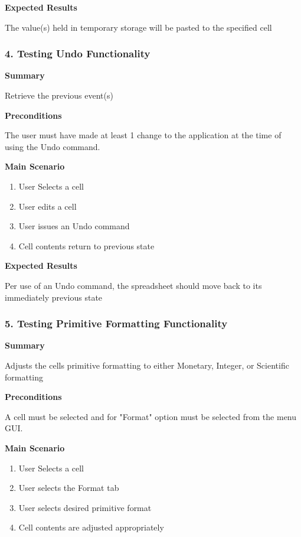 \documentclass[12pt]{article}
\begin{document}
\noindent
{\bf Expected Results}

The value(s) held in temporary storage will be pasted to the specified cell


\subsubsection{4. Testing Undo Functionality}

\noindent
{\bf Summary}

Retrieve the previous event(s)

\noindent
{\bf Preconditions}

The user must have made at least 1 change to the application at the time of using the Undo command. 

\noindent
{\bf Main Scenario}
\begin{enumerate}
	\item User Selects a cell
	\item User edits a cell
	\item User issues an Undo command
	\item Cell contents return to previous state
\end{enumerate}

\noindent
{\bf Expected Results}

Per use of an Undo command, the spreadsheet should move back to its immediately previous state

\subsubsection{5. Testing Primitive Formatting Functionality}

\noindent
{\bf Summary}

Adjusts the cells primitive formatting to either Monetary, Integer, or Scientific formatting

\noindent
{\bf Preconditions}

A cell must be selected and for "Format" option must be selected from the menu GUI. 

\noindent
{\bf Main Scenario}
\begin{enumerate}
	\item User Selects a cell
	\item User selects the Format tab
	\item User selects desired primitive format
	\item Cell contents are adjusted appropriately 
\end{enumerate}
\end{document}
